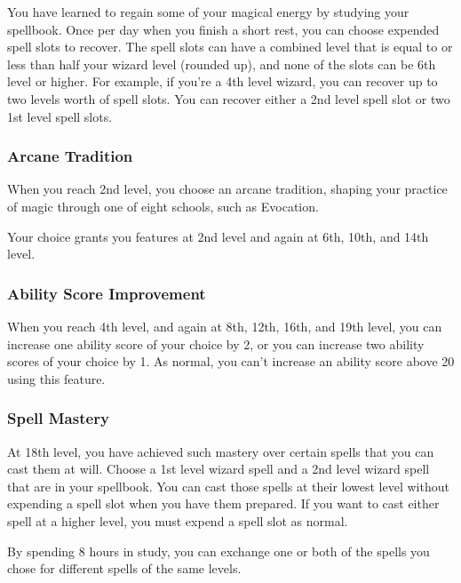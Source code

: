 \documentclass[
]{article}
\begin{document}
You have learned to regain some of your magical energy by studying your
spellbook. Once per day when you finish a short rest, you can choose
expended spell slots to recover. The spell slots can have a combined
level that is equal to or less than half your wizard level (rounded up),
and none of the slots can be 6th level or higher. For example, if you're
a 4th level wizard, you can recover up to two levels worth of spell
slots. You can recover either a 2nd level spell slot or two 1st level
spell slots.

\hypertarget{arcane-tradition}{%
\subsubsection{Arcane Tradition}\label{arcane-tradition}}

When you reach 2nd level, you choose an arcane tradition, shaping your
practice of magic through one of eight schools, such as Evocation.

Your choice grants you features at 2nd level and again at 6th, 10th, and
14th level.

\hypertarget{ability-score-improvement}{%
\subsubsection{Ability Score
Improvement}\label{ability-score-improvement}}

When you reach 4th level, and again at 8th, 12th, 16th, and 19th level,
you can increase one ability score of your choice by 2, or you can
increase two ability scores of your choice by 1. As normal, you can't
increase an ability score above 20 using this feature.

\hypertarget{spell-mastery}{%
\subsubsection{Spell Mastery}\label{spell-mastery}}

At 18th level, you have achieved such mastery over certain spells that
you can cast them at will. Choose a 1st level wizard spell and a 2nd
level wizard spell that are in your spellbook. You can cast those spells
at their lowest level without expending a spell slot when you have them
prepared. If you want to cast either spell at a higher level, you must
expend a spell slot as normal.

By spending 8 hours in study, you can exchange one or both of the spells
you chose for different spells of the same levels.
\end{document}
